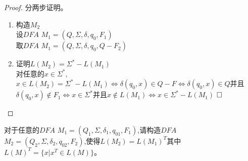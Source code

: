\begin{solution}
	\begin{proof}
		分两步证明。
		\begin{enumerate} 
			\item 构造$M_2$\\
			设$DFA$ $M_1=(Q,\Sigma,\delta,q_0,F_1)$\\
			取$DFA$ $M_1=(Q,\Sigma,\delta,q_0,Q-F_2)$
			\item 证明$L(M_2)=\Sigma^\ast-L(M_1)$\\
			对任意的$x\in\Sigma^\ast$,\\
			$x\in L(M_2)=\Sigma^\ast-L(M_1)\Leftrightarrow\delta(q_0,x)\in Q-F\Leftrightarrow\delta(q_0,x)\in Q$并且$\delta(q_0,x)\notin F_1\Leftrightarrow x\in\Sigma^\ast$并且$x\notin L(M_1)\Leftrightarrow x\in\Sigma^\ast-L(M_1)$ $\hfill\square$
		\end{enumerate}
	\end{proof}
\end{solution}	

\begin{exercise}
	对于任意的$DFA$ $M_1=(Q_1,\Sigma,\delta_1,q_{01},F_1)$,请构造$DFA$ $M_2=(Q_2,\Sigma,\delta_2,q_{02},F_2)$,使得$L(M_2)=L(M_1)^T$其中$L(M)^T=\{x|x^T \in L(M)\}$。
\end{exercise}

